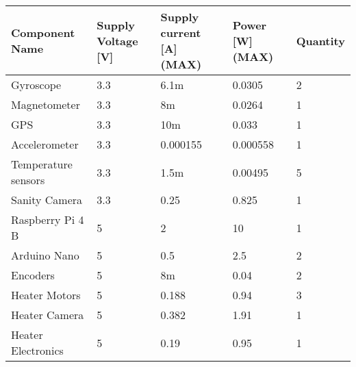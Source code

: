 
\begin{center}
\begin{table}[H]
\begin{tabular}{|m{}|m{}|m{}|m{}|m{}|}
\hline
\textbf{Component Name} & \textbf{Supply Voltage {[}V{]}} & \textbf{Supply current {[}A{]} (MAX)} & \textbf{Power {[}W{]} (MAX)} & \textbf{Quantity} \\ \hline
Gyroscope               & 3.3                             & 6.1m                                & 0.0305                       & 2                 \\ \hline
 Magnetometer           & 3.3                           & 8m                     & 0.0264                      & 1 \\ \hline
GPS                     & 3.3                             & 10m                                 & 0.033                        & 1                 \\ \hline
Accelerometer           & 3.3                             & 0.000155                            & 0.000558                     & 1                 \\ \hline
Temperature sensors     & 3.3                             & 1.5m                                & 0.00495                      & 5                 \\ \hline
Sanity Camera           & 3.3                             & 0.25                                & 0.825                        & 1                 \\ \hline
Raspberry Pi 4 B   & 5                               & 2                                   & 10                           & 1                 \\ \hline
Arduino Nano	 	& 5   					& 0.5
& 2.5						   & 2			\\ \hline
Encoders                & 5                               & 8m                                  & 0.04                         & 2                 \\ \hline
Heater Motors           & 5                               & 0.188                               & 0.94                         & 3                 \\ \hline
Heater Camera           & 5                               & 0.382                               & 1.91                         & 1                 \\ \hline
Heater Electronics      & 5                               & 0.19                                & 0.95                         & 1                 \\ \hline

\end{tabular}
\end{table}
\end{center}
